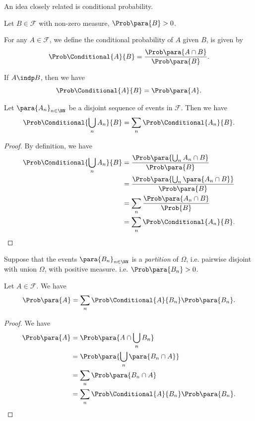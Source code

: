 An idea closely related is conditional probability.

\begin{definition}
    \label{def:conditional-prob}%
    Let \(B \in \mathcal{F}\) with non-zero measure, \(\Prob\para{B} > 0\).

    For any \(A \in \mathcal{F}\), we define the conditional probability of \(A\) given \(B\), is given by
    \[
        \Prob\Conditional{A}{B} = \frac{\Prob\para{A \cap B}}{\Prob\para{B}}.
    \]
\end{definition}

If \(A \indp B\), then we have
\[
    \Prob\Conditional{A}{B} = \Prob\para{A}.
\]

\begin{proposition}
    \label{prop:countable-additivity-conditional}%
    Let \(\para{A_n}_{n \in \NN}\) be a disjoint sequence of events in \(\mathcal{F}\). Then we have
    \[
        \Prob\Conditional{\bigcup_n A_n}{B} = \sum_{n} \Prob\Conditional{A_n}{B}.
    \]
\end{proposition}

\begin{proof}
    By definition, we have
    \begin{align*}
        \Prob\Conditional{\bigcup_{n} A_n}{B} &= \frac{\Prob\para{\bigcup_n A_n \cap B}}{\Prob\para{B}} \\
        &= \frac{\Prob\para{\bigcup_n \para{A_n \cap B}}}{\Prob\para{B}} \\
        &= \sum_{n} \frac{\Prob\para{A_n \cap B}}{\Prob{B}} \\
        &= \sum_{n} \Prob\Conditional{A_n}{B}.
    \end{align*}
\end{proof}

\begin{theorem}
    \label{thm:law-total-probability}%
    Suppose that the events \(\para{B_n}_{n \in \NN}\) is a \emph{partition} of \(\Omega\), i.e. pairwise disjoint with union \(\Omega\), with positive measure. i.e. \(\Prob\para{B_n} > 0\).

    Let \(A \in \mathcal{F}\). We have
    \[
        \Prob\para{A} = \sum_{n} \Prob\Conditional{A}{B_n} \Prob\para{B_n}.
    \]
\end{theorem}

\begin{proof}
    We have
    \begin{align*}
        \Prob\para{A} &= \Prob\para{A \cap \bigcup_{n} B_n} \\
        &= \Prob\para{\bigcup_n \para{B_n \cap A}} \\
        &= \sum_{n} \Prob\para{B_n \cap A} \\
        &= \sum_{n} \Prob\Conditional{A}{B_n} \Prob\para{B_n}.
    \end{align*}
\end{proof}

